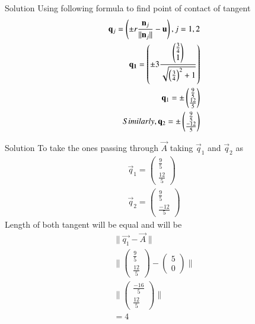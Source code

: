 \documentclass{beamer}
\begin{document}
\begin{frame}{Solution}
Using following formula to find point of contact of tangent
\begin{align}
    \mathbf{q}_{j}=\left(\pm r \frac{\mathbf{n}_j}{\lVert \mathbf{n}_j \rVert} -\mathbf{u}\right), j=1,2 \label{3} \\
    \mathbf{q_1}=\left(\pm 3 \frac{\begin{pmatrix}\frac{3}{4}\\1\end{pmatrix}}{\sqrt{\left(\frac{3}{4}\right)^2+1}}\right) \\
    \mathbf{q}_1=\pm \begin{pmatrix}\frac{9}{5}\\ \frac{12}{5}\end{pmatrix}\\
    Similarly, \mathbf{q}_2=\pm\begin{pmatrix}\frac{9}{5}\\ \frac{-12}{5}\end{pmatrix}
\end{align}
\end{frame}
\begin{frame}{Solution}
To take the ones passing through $\vec{A}$ taking $\vec{q}_1$ and $\vec{q}_2$ as
\begin{align}
\vec{q}_1=\begin{pmatrix}\frac{9}{5}\\ \frac{12}{5}\end{pmatrix}\\
\vec{q}_2=\begin{pmatrix}\frac{9}{5}\\ \frac{-12}{5}\end{pmatrix}    
\end{align}
Length of both tangent will be equal and will be
\begin{align}
    \lVert \vec{q_1}-\vec{A} \rVert\\
    \lVert \begin{pmatrix}\frac{9}{5}\\ \frac{12}{5}\end{pmatrix} -\begin{pmatrix}5\\0\end{pmatrix}\rVert\\
    \lVert \begin{pmatrix}\frac{-16}{5}\\ \frac{12}{5}\end{pmatrix}\rVert\\
    =4
\end{align}
\end{frame}
\end{document}
